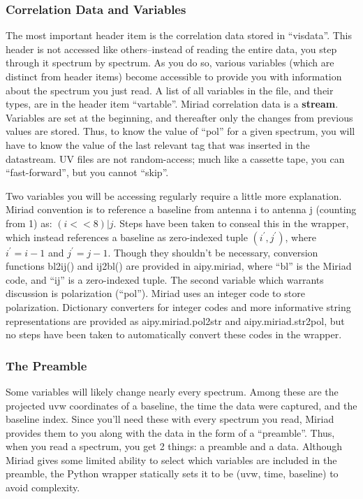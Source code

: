 \subsubsection{Correlation Data and Variables}
The most important header item is the correlation data stored
in ``visdata''.  This header is not accessed like others--instead of
reading the entire data, you step through it spectrum by spectrum.  As you do
so, various variables (which are distinct from header items) become accessible
to provide you with information about the spectrum you just read.  A list of
all variables in the file, and their types, are in the header item ``vartable''.
Miriad correlation data is a {\bf stream}.  Variables are set at the beginning,
and thereafter only the changes from previous values are stored.  Thus, to
know the value of ``pol'' for a given spectrum, you will have to know the
value of the last relevant tag that was inserted in the datastream.
UV files are not random-access; much like a cassette tape, you can
``fast-forward'', but you cannot ``skip''.

Two variables you will be accessing regularly require a little more
explanation.  Miriad convention is to reference a baseline from antenna i to
antenna j (counting from 1) as: $(i << 8) | j$.  Steps have been taken to
conseal this in the wrapper, which instead references a baseline as
zero-indexed tuple $(i^\prime, j^\prime)$, where $i^\prime = i-1$ and $j^\prime
= j-1$.  Though they shouldn't be necessary, conversion functions bl2ij() and
ij2bl() are provided in aipy.miriad, where ``bl'' is the Miriad code, and
``ij'' is a zero-indexed tuple.  The second variable which warrants discussion 
is polarization (``pol'').  Miriad uses an integer code to store polarization.  
Dictionary converters for integer codes and more informative string 
representations are provided as aipy.miriad.pol2str and aipy.miriad.str2pol, 
but no steps have been taken to automatically convert these codes in the
wrapper.

\subsubsection{The Preamble}
Some variables will likely change nearly every spectrum.  Among these are
the projected uvw coordinates of a baseline, the time the data were captured,
and the baseline index.  Since you'll need these with every spectrum you read,
Miriad provides them to you along with the data in the form of a ``preamble''.
Thus, when you read a spectrum, you get 2 things: a preamble and a data.
Although Miriad gives some limited ability to select which variables are
included in the preamble, the Python wrapper statically sets it to be
(uvw, time, baseline) to avoid complexity.

